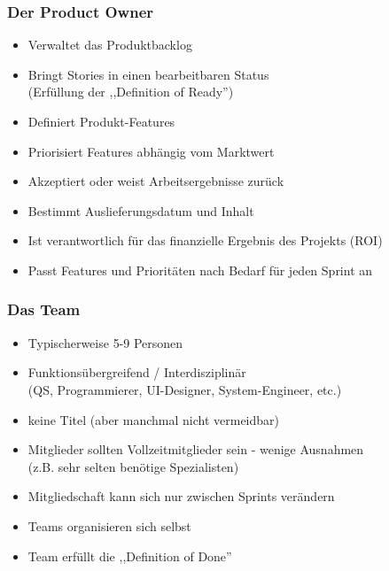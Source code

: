 

\frame
{
  \frametitle{Der Product Owner}
  \begin{itemize}
    \item{Verwaltet das Produktbacklog}
    \item{Bringt Stories in einen bearbeitbaren Status\\(Erfüllung der ,,Definition of Ready'')}
    \item{Definiert Produkt-Features}
    \item{Priorisiert Features abhängig vom Marktwert}
    \item{Akzeptiert oder weist Arbeitsergebnisse zurück}
    \item{Bestimmt Auslieferungsdatum und Inhalt}
    \item{Ist verantwortlich für das finanzielle Ergebnis des Projekts (ROI)}
    \item{Passt Features und Prioritäten nach Bedarf für jeden Sprint an}
  \end{itemize}
}



\frame
{
  \frametitle{Das Team}
  \begin{itemize}
      \item{Typischerweise 5-9 Personen}
      \item{Funktionsübergreifend / Interdisziplinär \\
        (QS, Programmierer, UI-Designer, System-Engineer, etc.)}
      \item{keine Titel (aber manchmal nicht vermeidbar)}
      \item{Mitglieder sollten Vollzeitmitglieder sein - wenige Ausnahmen \\(z.B. sehr selten benötige Spezialisten)}
      \item{Mitgliedschaft kann sich nur zwischen Sprints verändern}
      \item{Teams organisieren sich selbst}
      \item{Team erfüllt die ,,Definition of Done''}
  \end{itemize}
}

